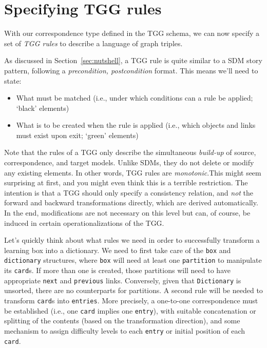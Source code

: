 \newpage
\hypertarget{sec:Rules}{}
\section{Specifying TGG rules}
\genHeader

With our correspondence type defined in the TGG schema, we can now specify a set of \emph{TGG rules} to describe a language of graph
triples.

As discussed in Section~\ref{sec:nutshell}, a TGG rule is quite similar to a SDM story pattern, following a \emph{precondition, postcondition}
format. This means we'll need to state:

\begin{itemize}

\item What must be matched (i.e., under which conditions can a rule be applied; `black' elements)

\item What is to be created when the rule is applied (i.e., which objects and links must exist upon exit; `green' elements)

\end{itemize}

\vspace{0.5cm}

Note that the rules of a TGG only describe the simultaneous \emph{build-up} of source, correspondence, and target models. Unlike SDMs, they do not delete or
modify any existing elements. In other words, TGG rules are \emph{monotonic}.This might seem surprising at first, and you might even think
this is a terrible restriction. The intention is that a TGG should only specify a consistency relation, and \emph{not} the forward and backward transformations
directly, which are derived automatically. In the end, modifications are not necessary on this level but can, of course, be induced in certain
operationalizations of the TGG.

Let's quickly think about what rules we need in order to successfully transform a learning box into a dictionary. We need to first take care of the \texttt{box}
and \texttt{dictionary} structures, where \texttt{box} will need at least one \texttt{partition} to manipulate its \texttt{card}s. If more than one is created,
those partitions will need to have appropriate \texttt{next} and \texttt{previous} links. Conversely, given that \texttt{Dictionary} is unsorted, there are no
counterparts for partitions. A second rule will be needed to transform \texttt{card}s into \texttt{entries}. More precisely, a one-to-one correspondence must be
established (i.e., one \texttt{card} implies one \texttt{entry}), with suitable
concatenation or splitting of the contents (based on the transformation direction), and some mechanism to assign difficulty levels to each \texttt{entry} or initial position of each \texttt{card}.







